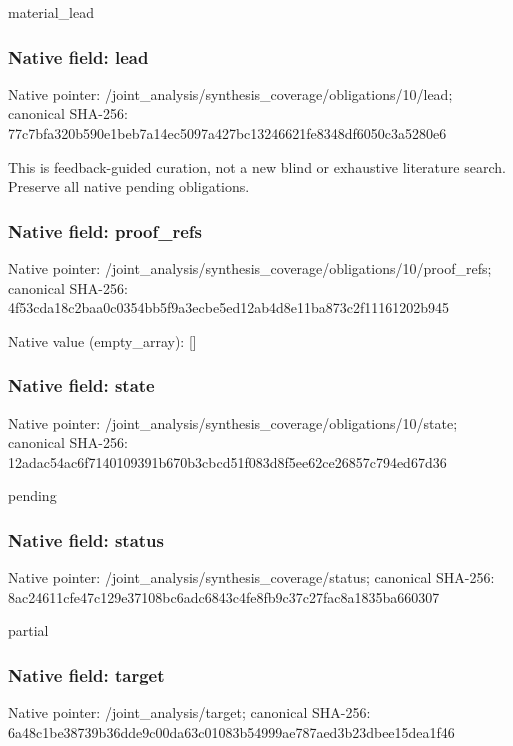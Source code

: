 \documentclass[10pt,a4paper]{article}
\begin{document}
\begingroup\raggedright\sloppy material\_\allowbreak{}lead\par\endgroup

\subsubsection{Native field: lead}
Native pointer: /joint\_\allowbreak{}analysis/synthesis\_\allowbreak{}coverage/obligations/10/lead; canonical SHA-256: 77c7bfa320b590e1beb7a14ec5097a427bc13246621fe8348df6050c3a5280e6

\begingroup\raggedright\sloppy This is feedback-guided curation,\allowbreak{} not a new blind or exhaustive literature search. Preserve all native pending obligations.\par\endgroup

\subsubsection{Native field: proof\_\allowbreak{}refs}
Native pointer: /joint\_\allowbreak{}analysis/synthesis\_\allowbreak{}coverage/obligations/10/proof\_\allowbreak{}refs; canonical SHA-256: 4f53cda18c2baa0c0354bb5f9a3ecbe5ed12ab4d8e11ba873c2f11161202b945

Native value (empty\_\allowbreak{}array): []

\subsubsection{Native field: state}
Native pointer: /joint\_\allowbreak{}analysis/synthesis\_\allowbreak{}coverage/obligations/10/state; canonical SHA-256: 12adac54ac6f7140109391b670b3cbcd51f083d8f5ee62ce26857c794ed67d36

\begingroup\raggedright\sloppy pending\par\endgroup

\subsubsection{Native field: status}
Native pointer: /joint\_\allowbreak{}analysis/synthesis\_\allowbreak{}coverage/status; canonical SHA-256: 8ac24611cfe47c129e37108bc6adc6843c4fe8fb9c37c27fac8a1835ba660307

\begingroup\raggedright\sloppy partial\par\endgroup

\subsubsection{Native field: target}
Native pointer: /joint\_\allowbreak{}analysis/target; canonical SHA-256: 6a48c1be38739b36dde9c00da63c01083b54999ae787aed3b23dbee15dea1f46
\end{document}
